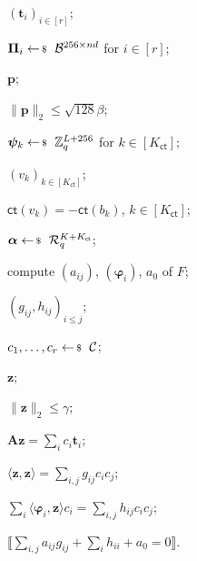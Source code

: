 \documentclass[../../book.tex]{subfiles}
\begin{document}
\begin{algoproto}[ht]
\begin{mdframed}[linecolor=black, linewidth=1pt,
                     skipabove=10pt, skipbelow=10pt,
                     innerleftmargin=5pt, innerrightmargin=5pt]
\begin{minipage}[t]{0.49\linewidth}
            \begin{algoen}
                \item {} $(\mathbf{t}_i)_{i \in [r]}$;
                \item {} $\boldsymbol{\Pi}_i \leftarrowS \mathcal{B}^{256 \times nd}$ for $i \in [r]$;
                \item {} $\mathbf{p}$;
                \item {} $\|\mathbf{p}\|_2 \leq \sqrt{128}\beta$;
                \item {} $\boldsymbol{\psi}_k \leftarrowS \mathbb{Z}_q^{L+256}$ for $k \in [K_{\mathsf{ct}}]$;
                \item {} $(v_k)_{k \in [K_{\mathsf{ct}}]}$;
                \item {} $\mathsf{ct}(v_k) = -\mathsf{ct}(b_k)$, $k \in [K_{\mathsf{ct}}]$;
                \item {} $\boldsymbol{\alpha} \leftarrowS \mathcal{R}_q^{K+K_{\mathsf{ct}}}$;
                \item compute $(a_{ij})$, $(\boldsymbol{\varphi}_i)$, $a_0$ of $F$;
                \item {} $(g_{ij}, h_{ij})_{i \leq j}$;
                \item {} $c_1, \dots, c_r \leftarrowS \mathcal{C}$;
                \item {} $\mathbf{z}$;
                \item {} $\|\mathbf{z}\|_2 \leq \gamma$;
                \item {} $\mathbf{A}\mathbf{z} = \sum_{i} c_i\mathbf{t}_i$;
                \item {} $\langle \mathbf{z}, \mathbf{z} \rangle = \sum_{i,j} g_{ij}c_ic_j$;
                \item {} $\sum_{i} \langle \boldsymbol{\varphi}_i, \mathbf{z} \rangle c_i = \sum_{i,j} h_{ij}c_ic_j$;
                \item {} $\llbracket \sum_{i,j} a_{ij}g_{ij} + \sum_{i} h_{ii} + a_0 = 0 \rrbracket$.
            \end{algoen}
        \end{minipage}
    \end{mdframed}
    \caption{The base protocol for $\mathcal{R}_{\mathsf{dot}}$ (without recursion). The family $\mathcal{F}_{\mathsf{ct}}$ is extended with the $256$ projection constraints, $\boldsymbol{\psi}_k$ are the coefficients of the $k$-th combination of the extended family, $Q_k$ and $b_k$ are the non-constant part and the constant term of this combination, and $F$ is the combination of $\mathcal{F}$ and the $K_{\mathsf{ct}} = \lceil 128/\log q \rceil$ constraints $Q_k - v_k$ with coefficients $\boldsymbol{\alpha}$.}
    \label{fig:labrador-base}
\end{algoproto}
\end{document}
